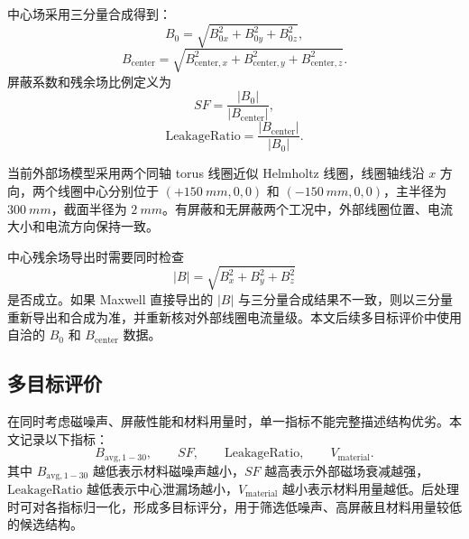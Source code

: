 \documentclass[UTF8,a4paper,12pt]{ctexart}
\begin{document}
中心场采用三分量合成得到：
\begin{equation}
    B_0 =
    \sqrt{B_{0x}^2+B_{0y}^2+B_{0z}^2},
\end{equation}
\begin{equation}
    B_{\mathrm{center}} =
    \sqrt{B_{\mathrm{center},x}^2+
          B_{\mathrm{center},y}^2+
          B_{\mathrm{center},z}^2}.
\end{equation}
屏蔽系数和残余场比例定义为
\begin{equation}
    SF = \frac{|B_0|}{|B_{\mathrm{center}}|},
\end{equation}
\begin{equation}
    \mathrm{LeakageRatio}
    = \frac{|B_{\mathrm{center}}|}{|B_0|}.
\end{equation}

当前外部场模型采用两个同轴 torus 线圈近似 Helmholtz 线圈，线圈轴线沿 \(x\) 方向，两个线圈中心分别位于
\((+\SI{150}{mm},0,0)\)
和
\((-\SI{150}{mm},0,0)\)，主半径为 \(\SI{300}{mm}\)，截面半径为 \(\SI{2}{mm}\)。有屏蔽和无屏蔽两个工况中，外部线圈位置、电流大小和电流方向保持一致。

中心残余场导出时需要同时检查
\begin{equation}
    |B| =
    \sqrt{B_x^2+B_y^2+B_z^2}
\end{equation}
是否成立。如果 Maxwell 直接导出的 \(|B|\) 与三分量合成结果不一致，则以三分量重新导出和合成为准，并重新核对外部线圈电流量级。本文后续多目标评价中使用自洽的 \(B_0\) 和 \(B_{\mathrm{center}}\) 数据。

\subsection{多目标评价}

在同时考虑磁噪声、屏蔽性能和材料用量时，单一指标不能完整描述结构优劣。本文记录以下指标：
\begin{equation}
    B_{\mathrm{avg},1-30}, \qquad
    SF, \qquad
    \mathrm{LeakageRatio}, \qquad
    V_{\mathrm{material}} .
\end{equation}
其中 \(B_{\mathrm{avg},1-30}\) 越低表示材料磁噪声越小，\(SF\) 越高表示外部磁场衰减越强，\(\mathrm{LeakageRatio}\) 越低表示中心泄漏场越小，\(V_{\mathrm{material}}\) 越小表示材料用量越低。后处理时可对各指标归一化，形成多目标评分，用于筛选低噪声、高屏蔽且材料用量较低的候选结构。
\end{document}
